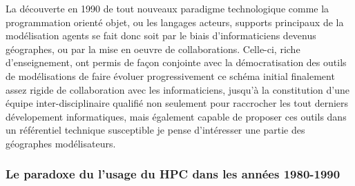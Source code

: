 
La découverte en 1990 de tout nouveaux paradigme technologique comme la programmation orienté objet, ou les langages acteurs, supports principaux de la modélisation agents se fait donc soit par le biais d’informaticiens devenus géographes, ou par la mise en oeuvre de collaborations. Celle-ci, riche d’enseignement, ont permis de façon conjointe avec la démocratisation des outils de modélisations de faire évoluer progressivement ce schéma initial finalement assez rigide de collaboration avec les informaticiens, jusqu’à la constitution d’une équipe inter-disciplinaire qualifié non seulement pour raccrocher les tout derniers dévelopement informatiques, mais également capable de proposer ces outils dans un référentiel technique susceptible je pense d'intéresser une partie des géographes modélisateurs.


\subsubsection{Le paradoxe du l'usage du HPC dans les années 1980-1990}

